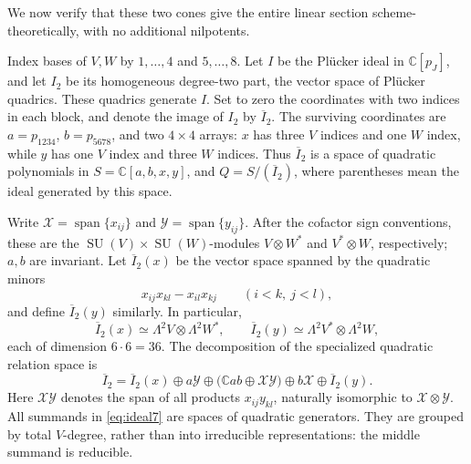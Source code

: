 \documentclass[11pt]{article}
\newcommand{\C}{\mathbb C}
\newcommand{\SU}{\operatorname{SU}}
\theoremstyle{definition}
\numberwithin{equation}{section}
\begin{document}
We now verify that these two cones give the entire linear section
scheme-theoretically, with no additional nilpotents.

Index bases of $V,W$ by $1,\ldots,4$ and $5,\ldots,8$.
Let $I$ be the Pl\"ucker ideal in $\C[p_J]$, and let $I_2$ be its
homogeneous degree-two part, the vector space of Pl\"ucker quadrics.
These quadrics generate $I$. Set to zero the coordinates with two
indices in each block, and denote the image of $I_2$ by
$\overline I_2$. The surviving coordinates are $a=p_{1234}$,
$b=p_{5678}$, and two $4\times4$ arrays: $x$ has three $V$ indices
and one $W$ index, while $y$ has one $V$ index and three $W$ indices.
Thus $\overline I_2$ is a space of quadratic polynomials in
$S=\C[a,b,x,y]$, and $Q=S/(\overline I_2)$, where parentheses
mean the ideal generated by this space.

Write $\mathcal X=\operatorname{span}\{x_{ij}\}$ and
$\mathcal Y=\operatorname{span}\{y_{ij}\}$. After the cofactor
sign conventions, these are the $\SU(V)\times\SU(W)$-modules
$V\otimes W^*$ and $V^*\otimes W$, respectively; $a,b$ are invariant.
Let $\overline I_2(x)$ be the vector space spanned by the quadratic minors
\[
 x_{ij}x_{kl}-x_{il}x_{kj}\qquad(i<k,\ j<l),
\]
and define $\overline I_2(y)$ similarly. In particular,
\[
 \overline I_2(x)\simeq\Lambda^2V\otimes\Lambda^2W^*,\qquad
 \overline I_2(y)\simeq\Lambda^2V^*\otimes\Lambda^2W,
\]
each of dimension $6\cdot6=36$.
The decomposition of the specialized quadratic relation space is
\begin{equation}\label{eq:ideal7}
 \overline I_2=\overline I_2(x)\oplus a\mathcal Y
 \oplus\bigl(\C ab\oplus\mathcal X\mathcal Y\bigr)
 \oplus b\mathcal X\oplus\overline I_2(y).
\end{equation}
Here $\mathcal X\mathcal Y$ denotes the span of all products
$x_{ij}y_{kl}$, naturally isomorphic to $\mathcal X\otimes\mathcal Y$.
All summands in \eqref{eq:ideal7} are spaces of quadratic generators.
They are grouped by total $V$-degree, rather than into irreducible
representations: the middle summand is reducible.
\end{document}
